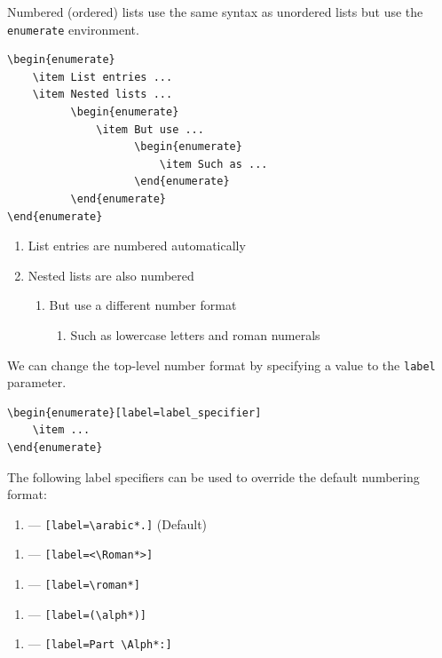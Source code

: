 \documentclass[11pt, twoside]{article}
\begin{document}
Numbered (ordered) lists use the same syntax as unordered lists but use the \lstinline{enumerate} environment.
\begin{lstlisting}
\begin{enumerate}
    \item List entries ...
    \item Nested lists ...
          \begin{enumerate}
              \item But use ...
                    \begin{enumerate}
                        \item Such as ...
                    \end{enumerate}
          \end{enumerate}
\end{enumerate}
\end{lstlisting}
\begin{enumerate}
    \item List entries are numbered automatically
    \item Nested lists are also numbered
          \begin{enumerate}
              \item But use a different number format
                    \begin{enumerate}
                        \item Such as lowercase letters and roman numerals
                    \end{enumerate}
          \end{enumerate}
\end{enumerate}
We can change the top-level number format by specifying a value to the \lstinline{label}
parameter.
\begin{lstlisting}
\begin{enumerate}[label=label_specifier]
    \item ...
\end{enumerate}
\end{lstlisting}
The following label specifiers can be used to override the default numbering format:
\begin{enumerate}[label=\arabic*.]
    \item --- \lstinline|[label=\arabic*.]| (Default)
\end{enumerate}
\begin{enumerate}[label=<\Roman*>]
    \item --- \lstinline|[label=<\Roman*>]|
\end{enumerate}
\begin{enumerate}[label=\roman*]
    \item --- \lstinline|[label=\roman*]|
\end{enumerate}
\begin{enumerate}[label=(\alph*)]
    \item --- \lstinline|[label=(\alph*)]|
\end{enumerate}
\begin{enumerate}[label=Part \Alph*:]
    \item --- \lstinline|[label=Part \Alph*:]|
\end{enumerate}
\newpage
\end{document}
